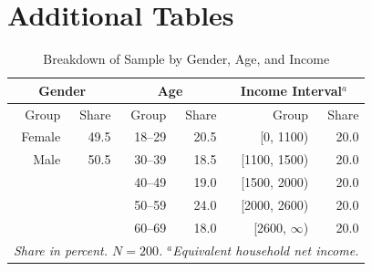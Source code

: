 \documentclass[smallcondensed]{svjour3}
\begin{document}
\section{Additional Tables}\label{sec:app_tables}
%
\begin{table}[ht]
   \centering
   \caption{Breakdown of Sample by Gender, Age, and Income}\label{tab:quota_demos}
   \begin{tabular}{rrrrrr}\\[0.5ex]\hline
   \multicolumn{2}{c}{Gender}   & \multicolumn{2}{c}{Age}   & \multicolumn{2}{c}{Income Interval$^a$}   \\\hline
   Group    & Share             & Group    & Share          & Group              & Share                \\\hline\hline
   Female   & 49.5              & 18--29   & 20.5           & [0, 1100)          & 20.0                 \\
   Male     & 50.5              & 30--39   & 18.5           & [1100, 1500)       & 20.0                 \\
            &                   & 40--49   & 19.0           & [1500, 2000)       & 20.0                 \\
            &                   & 50--59   & 24.0           & [2000, 2600)       & 20.0                 \\
            &                   & 60--69   & 18.0           & [2600, $\infty$)   & 20.0                 \\\hline
   \multicolumn{6}{p{8cm}}{\footnotesize{\textit{Share in percent. $N=200$. $^a$Equivalent household net income.}}}
   \end{tabular}
\end{table}
%
\clearpage
%
\end{document}
